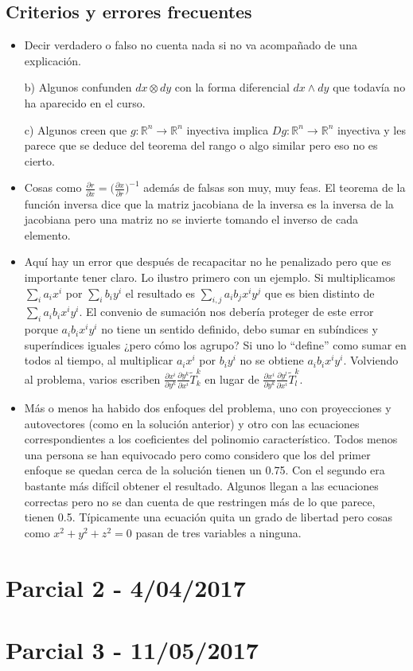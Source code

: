 \subsection{Criterios y errores frecuentes}
\begin{itemize}
	\item Decir verdadero o falso no cuenta nada si no va acompañado de una explicación. 
	
	
	b) Algunos confunden $dx\otimes dy$ con la forma diferencial $dx\wedge dy$ que todavía no ha aparecido en el curso. 
	
	c) Algunos creen que $g:ℝ^n\longrightarrow ℝ^n$ inyectiva implica $Dg:ℝ^n\longrightarrow ℝ^n$ inyectiva y les parece que se deduce del teorema del rango o algo similar pero eso no es cierto.
	\item Cosas como $\frac{\partial r}{\partial x}=\big(\frac{\partial x}{\partial r}\big)^{-1}$ además de falsas son muy, muy feas.  El teorema de la función inversa dice que la matriz jacobiana de la inversa es la inversa de la jacobiana pero una matriz no se invierte tomando el inverso de cada elemento. 
	\item Aquí hay un error que después de recapacitar no he penalizado pero que es importante tener claro. Lo ilustro primero con un ejemplo. Si multiplicamos  $\sum_i a_i x^i$ por $\sum_i b_i y^i$ el resultado es  $\sum_{i,j} a_ib_j x^iy^j$ que es bien distinto de $\sum_{i} a_ib_i x^iy^i$. El convenio de sumación nos debería proteger de este error porque $a_ib_i x^iy^i$ no tiene un sentido definido, debo sumar en subíndices y superíndices iguales ¿pero cómo los agrupo? Si uno lo ``define'' como sumar en todos al tiempo, al multiplicar $a_ix^i$ por $b_iy^i$ no se obtiene $a_ib_i x^iy^i$. Volviendo al problema, varios escriben 
	$\frac{\partial x^i}{\partial y^k}
	\frac{\partial y^k}{\partial x^i}
	\widetilde{T}^k_k$
	en lugar de 
	$\frac{\partial x^i}{\partial y^k}
	\frac{\partial y^l}{\partial x^i}
	\widetilde{T}^k_l$. 
	\item Más o menos ha habido dos enfoques del problema, uno con proyecciones y autovectores (como en la solución anterior) y otro con las ecuaciones correspondientes a los coeficientes del polinomio característico. Todos menos una persona se han equivocado pero como considero que los del primer enfoque se quedan cerca de la solución  tienen un 0.75. Con el segundo era bastante más difícil obtener el resultado. Algunos llegan a las ecuaciones correctas pero no se dan cuenta de que restringen más de lo que parece, tienen 0.5. Típicamente una ecuación quita un grado de libertad pero cosas como $x^2+y^2+z^2=0$ pasan de tres variables a ninguna. 
\end{itemize}
\section{Parcial 2 - 4/04/2017}
\section{Parcial 3 - 11/05/2017}